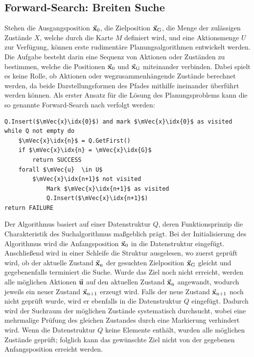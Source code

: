 \subsection{Forward-Search: Breiten Suche}
Stehen die Ausgangsposition $\vec{\mathbf{x}}_{\text{0}}$, die Zielposition $\vec{\mathbf{x}}_{\text{G}}$, die Menge der zulässigen Zustände $X$, welche durch die Karte $M$ definiert wird, und eine Aktionsmenge $U$ zur Verfügung, können erste rudimentäre Planungsalgorithmen entwickelt werden. Die Aufgabe besteht darin eine Sequenz von Aktionen oder Zuständen zu bestimmen, welche die Positionen $\vec{\mathbf{x}}_{\text{0}}$ und $\vec{\mathbf{x}}_{\text{G}}$ miteinander verbinden. Dabei spielt es keine Rolle, ob Aktionen oder wegzusammenhängende Zustände berechnet werden, da beide Darstellungsformen des Pfades mithilfe ineinander überführt werden können. Als erster Ansatz für die Lösung des Planungsproblems kann die so genannte Forward-Search nach \cite[S. 28]{PlanAlgo} verfolgt werden:
\begin{lstlisting}[mathescape=true, caption={Ablauf der Forward-Search in Pseudocode}]
Q.Insert($\mVec{x}\idx{0}$) and mark $\mVec{x}\idx{0}$ as visited
while Q not empty do
	$\mVec{x}\idx{n}$ = Q.GetFirst()
	if $\mVec{x}\idx{n} = \mVec{x}\idx{G}$
		return SUCCESS
	forall $\mVec{u}  \in U$
		$\mVec{x}\idx{n+1}$ not visited
			Mark $\mVec{x}\idx{n+1}$ as visited
			Q.Insert($\mVec{x}\idx{n+1}$)
return FAILURE
\end{lstlisting}
Der Algorithmus basiert auf einer Datenstruktur $Q$, deren Funktionsprinzip die Charakteristik des Suchalgorithmus maßgeblich prägt. Bei der Initialisierung des Algorithmus wird die Anfangsposition $\vec{\mathbf{x}}_{\text{0}}$ in die Datenstruktur eingefügt. Anschließend wird in einer Schleife die Struktur ausgelesen, wo zuerst geprüft wird, ob der aktuelle Zustand $\vec{\mathbf{x}}_{\text{n}}$ der gesuchten Zielposition $\vec{\mathbf{x}}_{\text{G}}$ gleicht und gegebenenfalls terminiert die Suche. Wurde das Ziel noch nicht erreicht, werden alle möglichen Aktionen $\vec{\mathbf{u}}$ auf den aktuellen Zustand $\vec{\mathbf{x}}_{\text{n}}$ angewandt, wodurch jeweils ein neuer Zustand $\vec{\mathbf{x}}_{\text{n+1}}$ erzeugt wird. Falls der neue Zustand $\vec{\mathbf{x}}_{\text{n+1}}$ noch nicht geprüft wurde, wird er ebenfalls in die Datenstruktur $Q$ eingefügt. Dadurch wird der Suchraum der möglichen Zustände systematisch durchsucht, wobei eine mehrmalige Prüfung des gleichen Zustandes durch eine Markierung verhindert wird. Wenn die Datenstruktur $Q$ keine Elemente enthält, wurden alle möglichen Zustände geprüft; folglich kann das gewünschte Ziel nicht von der gegebenen Anfangsposition erreicht werden.

